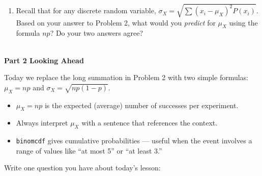 \documentclass[10pt]{article}
\begin{document}
\begin{enumerate}
    \vspace{4pt}
    $\mu_X = \sum x_i P(x_i) = $ 

    \vspace{0.1in}

    \item Recall that for any discrete random variable, $\sigma_X = \sqrt{\sum(x_i - \mu_X)^2 P(x_i)}$.
    Based on your answer to Problem 2, what would you \emph{predict} for $\mu_X$ using
    the formula $np$? Do your two answers agree?\\
    \\[1pt]

\end{enumerate}

\vspace{0.08in}

{\large\bfseries\color{navy} Part 2 \quad Looking Ahead}

\vspace{0.08in}

\noindent Today we replace the long summation in Problem 2 with two simple formulas:
$\mu_X = np$ and $\sigma_X = \sqrt{np(1-p)}$.

\vspace{0.1in}

\begin{tcolorbox}[colback=greenbg, colframe=greenacc, boxrule=0.8pt, arc=2mm,
    left=4mm, right=4mm, top=3mm, bottom=3mm]
    \small
    \begin{itemize}[leftmargin=1.3em, itemsep=4pt]
  \item $\mu_X = np$ is the expected (average) number of successes per experiment.
  \item Always interpret $\mu_X$ with a sentence that references the context.
  \item \texttt{binomcdf} gives cumulative probabilities --- useful when the event
        involves a range of values like ``at most 5'' or ``at least 3.''
    \end{itemize}
\end{tcolorbox}

\vspace{0.1in}

\noindent\textcolor{slate}{\small Write one question you have about today's lesson:}\\[4pt]
\\[2pt]\ansline{}
\end{document}
